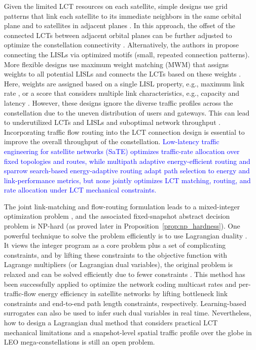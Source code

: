 \documentclass[journal]{IEEEtran}
\newcommand{\blue}[1]{\textcolor{blue}{#1}}
\begin{document}
Given the limited LCT resources on each satellite, simple designs use grid patterns that link each satellite to its immediate neighbors in the same orbital plane and to satellites in adjacent planes \cite{chaudhry2021laser,chen2021analysis}.
In this approach, the offset of the connected LCTs between adjacent orbital planes can be further adjusted to optimize the constellation connectivity \cite{rao2025minimumhop,guo2024constellation}.
Alternatively, the authors in \cite{bhattacherjee2019network} propose connecting the LISLs via optimized motifs (small, repeated connection patterns).
More flexible designs use maximum weight matching (MWM) that assigns weights to all potential LISLs and connects the LCTs based on these weights \cite{leyva-mayorga2021interplane,ron2025time}. Here, weights are assigned based on a single LISL property, e.g., maximum link rate \cite{leyva-mayorga2021interplane}, or a score that considers multiple link characteristics, e.g., capacity and latency \cite{ron2025time}.
However, these designs ignore the diverse traffic profiles across the constellation due to the uneven distribution of users and gateways.
This can lead to underutilized LCTs and LISLs and suboptimal network throughput \cite{bhattacherjee2019network}. 
Incorporating traffic flow routing into the LCT connection design is essential to improve the overall throughput of the constellation.
\blue{Low-latency traffic engineering for satellite networks (SaTE) \cite{wu2025sate} optimizes traffic-rate allocation over fixed topologies and routes, while multipath adaptive energy-efficient routing \cite{xu2025mpaee} and sparrow search-based energy-adaptive routing \cite{xu2025sparrow} adapt path selection to energy and link-performance metrics, but none jointly optimizes LCT matching, routing, and rate allocation under LCT mechanical constraints.}

The joint link-matching and flow-routing formulation leads to a mixed-integer optimization problem \cite{ahuja1993network}, and the associated fixed-snapshot abstract decision problem is NP-hard \cite{jarry2012multiflows} (as proved later in Proposition~\ref{prop:np_hardness}).
One powerful technique to solve the problem efficiently is to use Lagrangian duality \cite{fisher2004lagrangian}.
It views the integer program as a core problem plus a set of complicating constraints, and by lifting these constraints to the objective function with Lagrange multipliers (or Lagrangian dual variables), the original problem is relaxed and can be solved efficiently due to fewer constraints \cite{ahuja1993network}. 
This method has been successfully applied to optimize the network coding multicast rates \cite{wang2023joint} and per-traffic-flow energy efficiency \cite{huang2025lagrangianbased} in satellite networks by lifting bottleneck link constraints and end-to-end path length constraints, respectively.
Learning-based surrogates can also be used to infer such dual variables in real time.
Nevertheless, how to design a Lagrangian dual method that considers practical LCT mechanical limitations and a snapshot-level spatial traffic profile over the globe in LEO mega-constellations is still an open problem.
\end{document}
